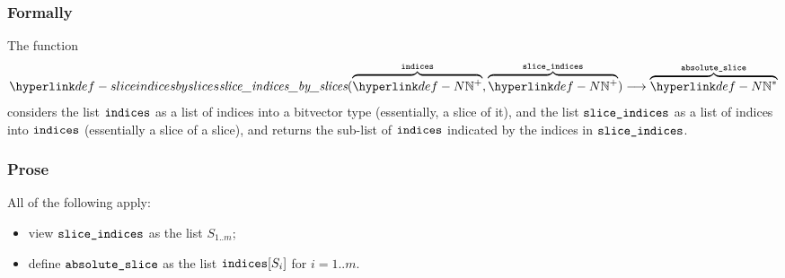 \subsubsection{Formally}
\begin{mathpar}
\end{mathpar}

\hypertarget{def-sliceindicesbyslices}{}
The function
\[
\sliceindicesbyslices(\overname{\N^+}{\indices}, \overname{\N^+}{\sliceindices})
\aslto \overname{\N^*}{\vabsslice}
\]
considers the list $\indices$ as a list of indices into a bitvector type (essentially, a slice of it),
and the list $\sliceindices$ as a list of indices into $\indices$ (essentially a slice of a slice),
and returns the sub-list of $\indices$ indicated by the indices in $\sliceindices$.

\subsubsection{Prose}
All of the following apply:
\begin{itemize}
  \item view $\sliceindices$ as the list $S_{1..m}$;
  \item define $\vabsslice$ as the list $\indices[S_i]$ for $i=1..m$.
\end{itemize}

